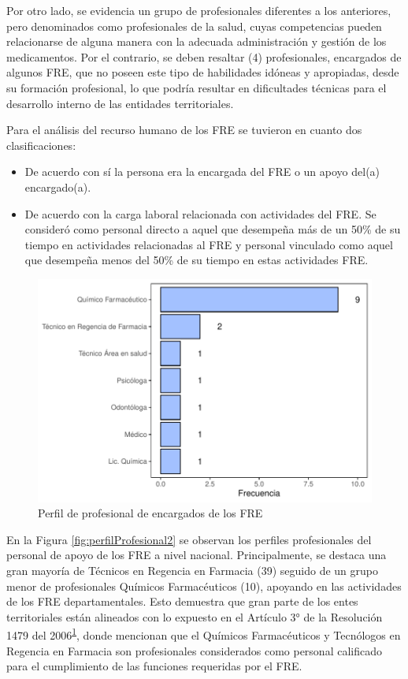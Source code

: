 \documentclass[
]{book}
\begin{document}
Por otro lado, se evidencia un grupo de profesionales diferentes a los anteriores, pero denominados como profesionales de la salud, cuyas competencias pueden relacionarse de alguna manera con la adecuada administración y gestión de los medicamentos. Por el contrario, se deben resaltar (4) profesionales, encargados de algunos FRE, que no poseen este tipo de habilidades idóneas y apropiadas, desde su formación profesional, lo que podría resultar en dificultades técnicas para el desarrollo interno de las entidades territoriales.

Para el análisis del recurso humano de los FRE se tuvieron en cuanto dos clasificaciones:

\begin{itemize}
\item
  De acuerdo con sí la persona era la encargada del FRE o un apoyo del(a) encargado(a).
\item
  De acuerdo con la carga laboral relacionada con actividades del FRE. Se consideró como personal directo a aquel que desempeña más de un 50\% de su tiempo en actividades relacionadas al FRE y personal vinculado como aquel que desempeña menos del 50\% de su tiempo en estas actividades FRE.
\end{itemize}

\begin{figure}
\includegraphics[width=1\linewidth]{InformeFinal_files/figure-latex/perfilProfesionalEncargado-1} \caption{Perfil de profesional de encargados de los FRE}\label{fig:perfilProfesionalEncargado}
\end{figure}

En la Figura \ref{fig:perfilProfesional2} se observan los perfiles profesionales del personal de apoyo de los FRE a nivel nacional. Principalmente, se destaca una gran mayoría de Técnicos en Regencia en Farmacia (39) seguido de un grupo menor de profesionales Químicos Farmacéuticos (10), apoyando en las actividades de los FRE departamentales. Esto demuestra que gran parte de los entes territoriales están alineados con lo expuesto en el Artículo 3° de la Resolución 1479 del 2006\textsuperscript{\protect\hyperlink{ref-MSPS1479-2006}{1}}, donde mencionan que el Químicos Farmacéuticos y Tecnólogos en Regencia en Farmacia son profesionales considerados como personal calificado para el cumplimiento de las funciones requeridas por el FRE.
\end{document}
